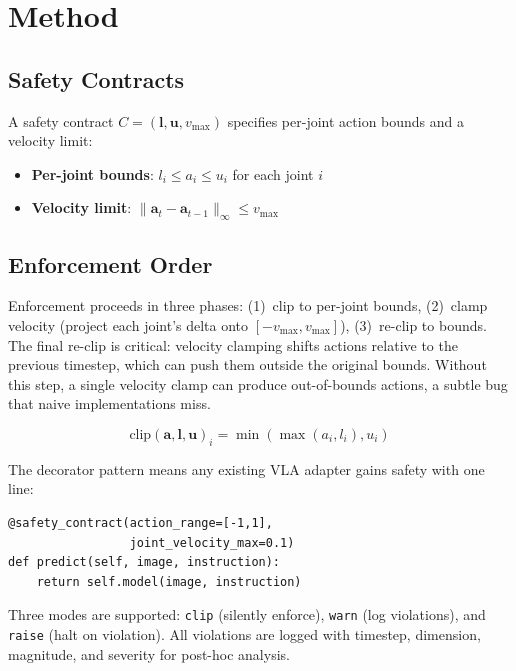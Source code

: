 \documentclass[conference]{IEEEtran}
\begin{document}
\section{Method}

\subsection{Safety Contracts}

A safety contract $C = (\mathbf{l}, \mathbf{u}, v_{\max})$ specifies per-joint action bounds and a velocity limit:
\begin{itemize}
    \item \textbf{Per-joint bounds}: $l_i \leq a_i \leq u_i$ for each joint $i$
    \item \textbf{Velocity limit}: $\|\mathbf{a}_t - \mathbf{a}_{t-1}\|_\infty \leq v_{\max}$
\end{itemize}

\subsection{Enforcement Order}
\label{sec:enforcement}

Enforcement proceeds in three phases: (1)~clip to per-joint bounds, (2)~clamp velocity (project each joint's delta onto $[-v_{\max}, v_{\max}]$), (3)~re-clip to bounds.
The final re-clip is critical: velocity clamping shifts actions relative to the previous timestep, which can push them outside the original bounds.
Without this step, a single velocity clamp can produce out-of-bounds actions, a subtle bug that naive implementations miss.

\begin{equation}
    \text{clip}(\mathbf{a}, \mathbf{l}, \mathbf{u})_i = \min(\max(a_i, l_i), u_i)
\end{equation}

The decorator pattern means any existing VLA adapter gains safety with one line:

{\small
\begin{verbatim}
@safety_contract(action_range=[-1,1],
                 joint_velocity_max=0.1)
def predict(self, image, instruction):
    return self.model(image, instruction)
\end{verbatim}
}

Three modes are supported: \texttt{clip} (silently enforce), \texttt{warn} (log violations), and \texttt{raise} (halt on violation). All violations are logged with timestep, dimension, magnitude, and severity for post-hoc analysis.
\end{document}
